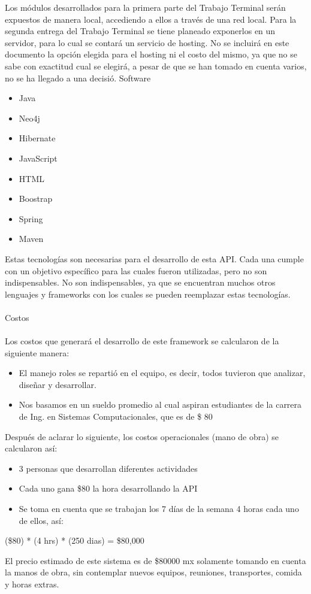Los módulos desarrollados para la primera parte del Trabajo Terminal serán expuestos de 
manera local, accediendo a ellos a través de una red local. Para la segunda entrega del 
Trabajo Terminal se tiene planeado exponerlos en un servidor, para lo cual se contará un 
servicio de hosting. No se incluirá en este documento la opción elegida para el hosting ni el 
costo del mismo, ya que no se sabe con exactitud cual se elegirá, a pesar de que se han 
tomado en cuenta varios, no se ha llegado a una decisió.
\newpage
Software  
\begin{itemize}
\item Java
\item Neo4j
\item Hibernate
\item JavaScript
\item HTML
\item Boostrap
\item Spring
\item Maven
\end{itemize}
Estas tecnologías son necesarias para el desarrollo de esta API. Cada una cumple con un  objetivo específico para las cuales fueron utilizadas, pero no son indispensables. No son indispensables, ya que se encuentran muchos otros lenguajes y frameworks con los cuales se pueden reemplazar estas tecnologías. 
\\\\
Costos 
\\\\
Los costos que generará el desarrollo de este framework se calcularon de la siguiente manera: 
\begin{itemize}
\item El manejo roles se repartió en el equipo, es decir, todos tuvieron que analizar, 
diseñar y desarrollar.  
\item Nos basamos en un sueldo promedio al cual aspiran estudiantes de la carrera de 
Ing. en Sistemas Computacionales, que es de \$ 80
\end{itemize}
Después de aclarar lo siguiente, los costos operacionales (mano de obra) se calcularon así:
\begin{itemize}
\item 3 personas que desarrollan diferentes actividades 
\item Cada uno gana \$80 la hora desarrollando la API 
\item Se toma en cuenta que se  trabajan los 7 días de la semana 4 horas cada uno de ellos, así: 
\end{itemize}
(\$80) * (4 hrs) * (250 dias) = \$80,000 
 
El precio estimado de este sistema es de \$80000 mx solamente tomando en cuenta la manos de obra, sin contemplar nuevos equipos, reuniones, transportes, comida y horas extras. 
\newpage
	
	
	
	

